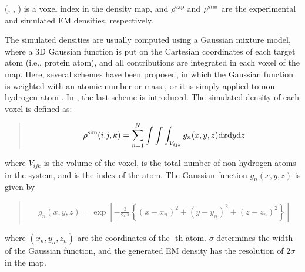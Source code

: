 \documentclass[a4paper,11pt,oneside,english]{sphinxmanual}
\begin{document}
(, , ) is a voxel index in the density map,
and \(\rho ^{\exp }\) and \({\rho ^{{\rm{sim}}}}\) are
the experimental and simulated EM densities, respectively.

The simulated densities are usually computed using a
Gaussian mixture model, where a 3D Gaussian function is put
on the Cartesian coordinates of each target atom (i.e., protein atom),
and all contributions are integrated in each voxel of the map.
Here, several schemes have been proposed, in which the Gaussian
function is weighted with an atomic number  or mass ,
or it is simply applied to non-hydrogen atom .
In , the last scheme is introduced. The simulated density of each voxel is defined as:
\begin{quote}

\vspace{-5mm}
\begin{equation*}
\begin{split}{\rho ^{{\rm{sim}}}}(i.j,k) = \sum\limits_{n = 1}^N {\int {\int {\int_{{V_{ijk}}} {{g_n}(x,y,z){\rm{d}}x{\rm{d}}y{\rm{d}}z} } } }\end{split}
\end{equation*}
\vspace{-3mm}
\end{quote}

where \(V_{ijk}\) is the volume of the voxel,  is the total number of
non-hydrogen atoms in the system, and  is the index of the atom.
The Gaussian function \({g_n}(x,y,z)\) is given by
\begin{quote}

\vspace{-5mm}
\begin{equation*}
\begin{split}{g_n}(x,y,z) = \exp \left[ { - \frac{3}{{2{\sigma ^2}}}\left\{ {{{(x - {x_n})}^2} + {{(y - {y_n})}^2} + {{(z - {z_n})}^2}} \right\}} \right]\end{split}
\end{equation*}
\vspace{-3mm}
\end{quote}

where \(({x_n},{y_n},{z_n})\) are the coordinates of the -th atom.
\(\sigma\) determines the width of the Gaussian function, and the
generated EM density has the resolution of \(2\sigma\) in the map.
\end{document}
